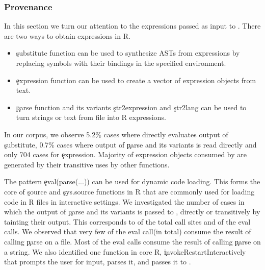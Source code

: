 \documentclass[conference]{IEEEtran}
\begin{document}
\subsubsection{Provenance}

In this section we turn our attention to the \AllExpressionInputEvalCallPerc
expressions passed as input to \eval. There are two ways to obtain
expressions in R.
\begin{itemize}
  \item \c{substitute} function can be used to synthesize ASTs from
  expressions by replacing symbols with their bindings in the specified
  environment.
  \item \c{expression} function can be used to create a vector of expression
    objects from text.
  \item \c{parse} function and its variants \c{str2expression} and \c{str2lang}
    can be used to turn strings or text from file into R expressions.
\end{itemize}

In our corpus, we observe 5.2\% cases where \eval directly evaluates output of
\c{substitute}, 0.7\% cases where output of \c{parse} and its variants is read
directly and only 704 cases for \c{expression}. Majority of expression objects
consumed by \eval are generated by their transitive uses by other functions.

The pattern \c{eval(parse(...))} can be used for dynamic code loading. This
forms the core of \c{source} and \c{sys.source} functions in R that are commonly
used for loading code in R files in interactive settings. We investigated the
number of cases in which the output of \c{parse} and its variants is passed to
\eval, directly or transitively by tainting their output. This corresponds to \PercentParsedCallSites of the total \eval call sites and
\PercentParsedEvals of the eval calls. We observed that
very few of the eval call(\NbParseFilesRnd in total) consume the result of calling \c{parse} on
a file. Most of the eval calls consume the result of calling
\c{parse} on a string.  We also identified one
function in core R, \c{invokeRestartInteractively} that prompts the user for
input, parses it, and passes it to \eval.
\end{document}
